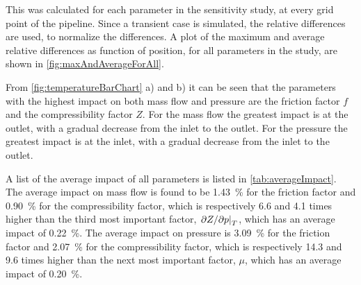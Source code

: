 This was calculated for each parameter in the sensitivity study, at every grid point of the pipeline. Since a transient case is simulated, the relative differences are used, to normalize the differences. %
%
%
A plot of the maximum and average relative differences as function of position, for all parameters in the study, are shown in \cref{fig:maxAndAverageForAll}. 

From \cref{fig:temperatureBarChart} a) and b) it can be seen that the parameters with the highest impact on both mass flow and pressure are the friction factor $f$ and the compressibility factor $Z$. For the mass flow the greatest impact is at the outlet, with a gradual decrease from the inlet to the outlet. For the pressure the greatest impact is at the inlet, with a gradual decrease from the inlet to the outlet. 

A list of the average impact of all parameters is listed in \cref{tab:averageImpact}. %
%
The average impact on mass flow is found to be \SI{1.43}{\percent} for the friction factor and \SI{0.90}{\percent} for the compressibility factor, %
which is respectively 6.6 and 4.1 times higher than the third most important factor, $\eval{\partial Z/\partial p}_T$, which has an average impact of \SI{0.22}{\percent}. %
%
The average impact on pressure is \SI{3.09}{\percent} for the friction factor and \SI{2.07}{\percent} for the compressibility factor, %
which is respectively 14.3 and 9.6 times higher than the next most important factor, $\mu$, which has an average impact of \SI{0.20}{\percent}. %
%

